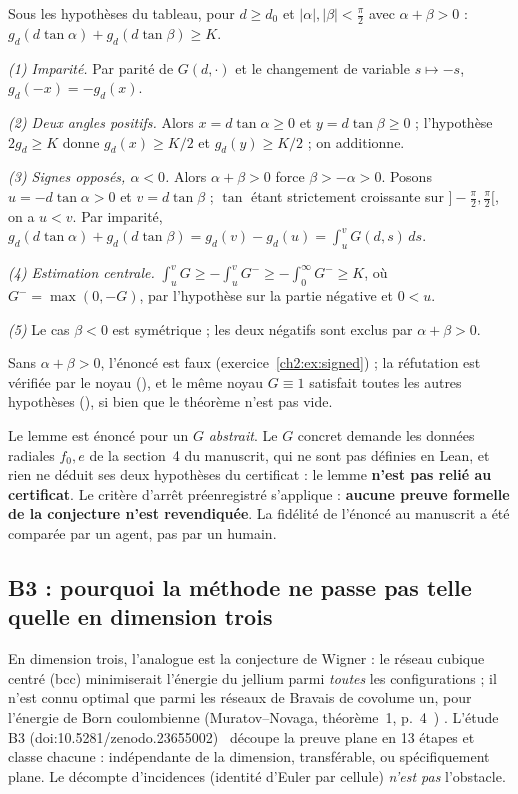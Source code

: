 \begin{theorem}\label{ch2:thm:signed}
Sous les hypothèses du tableau, pour $d\ge d_0$ et $|\alpha|,|\beta|<\frac\pi2$ avec $\alpha+\beta>0$ :
$g_d(d\tan\alpha)+g_d(d\tan\beta)\ge K$. \tierAs
\end{theorem}
\begin{humanproof}
\emph{(1) Imparité.} Par parité de $G(d,\cdot)$ et le changement de variable $s\mapsto-s$, $g_d(-x)=-g_d(x)$.

\emph{(2) Deux angles positifs.} Alors $x=d\tan\alpha\ge0$ et $y=d\tan\beta\ge0$ ; l'hypothèse $2g_d\ge K$ donne
$g_d(x)\ge K/2$ et $g_d(y)\ge K/2$ ; on additionne.

\emph{(3) Signes opposés, $\alpha<0$.} Alors $\alpha+\beta>0$ force $\beta>-\alpha>0$. Posons $u=-d\tan\alpha>0$ et
$v=d\tan\beta$ ; $\tan$ étant strictement croissante sur $]-\frac\pi2,\frac\pi2[$, on a $u<v$. Par imparité,
$g_d(d\tan\alpha)+g_d(d\tan\beta)=g_d(v)-g_d(u)=\int_u^vG(d,s)\,ds$.

\emph{(4) Estimation centrale.} $\int_u^vG\ge-\int_u^vG^-\ge-\int_0^\infty G^-\ge K$, où $G^-=\max(0,-G)$, par
l'hypothèse sur la partie négative et $0<u$.

\emph{(5)} Le cas $\beta<0$ est symétrique ; les deux négatifs sont exclus par $\alpha+\beta>0$.
\end{humanproof}
\noindent Sans $\alpha+\beta>0$, l'énoncé est faux (exercice~\ref{ch2:ex:signed}) ; la réfutation est vérifiée par le
noyau (), et le même noyau $G\equiv1$ satisfait toutes les autres hypothèses
(), si bien que le théorème n'est pas vide.

\begin{warnbox}
Le lemme est énoncé pour un $G$ \emph{abstrait}. Le $G$ concret demande les données radiales $f_0,e$ de la section~4 du
manuscrit, qui ne sont pas définies en Lean, et rien ne déduit ses deux hypothèses du certificat : le lemme \textbf{n'est
pas relié au certificat}. Le critère d'arrêt préenregistré s'applique : \textbf{aucune preuve formelle de la conjecture
n'est revendiquée}. La fidélité de l'énoncé au manuscrit a été comparée par un agent, pas par un humain.
\end{warnbox}

\subsection{B3 : pourquoi la méthode ne passe pas telle quelle en dimension trois}\label{ch2:ssec:b3}
En dimension trois, l'analogue est la conjecture de Wigner : le réseau cubique centré (bcc) minimiserait l'énergie du
jellium parmi \emph{toutes} les configurations ; il n'est connu optimal que parmi les réseaux de Bravais de covolume un, pour l'énergie de Born coulombienne (Muratov--Novaga, théorème~1, p.~4~\cite{ch2mn})
\tierL. L'étude B3 (doi\string:10.5281/zenodo.23655002)~\cite{ch2b3} découpe la preuve plane en 13 étapes et classe chacune :
indépendante de la dimension, transférable, ou spécifiquement plane. Le décompte d'incidences (identité d'Euler par
cellule) \emph{n'est pas} l'obstacle.


